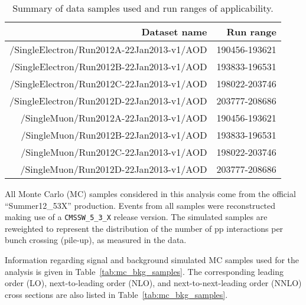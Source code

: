 \begin{table}[]
  \begin{center}
  \begin{tabular}{r|r}
  \hline
  Dataset name & Run range \\
  \hline
  /SingleElectron/Run2012A-22Jan2013-v1/AOD   &  190456-193621           \\
  \hline
  /SingleElectron/Run2012B-22Jan2013-v1/AOD   &   193833-196531       \\
  \hline
  /SingleElectron/Run2012C-22Jan2013-v1/AOD & 198022-203746\\
  \hline
  /SingleElectron/Run2012D-22Jan2013-v1/AOD  & 203777-208686 \\
  \hline
  /SingleMuon/Run2012A-22Jan2013-v1/AOD   &  190456-193621           \\
  \hline
  /SingleMuon/Run2012B-22Jan2013-v1/AOD   &   193833-196531       \\
  \hline
  /SingleMuon/Run2012C-22Jan2013-v1/AOD & 198022-203746\\
  \hline
  /SingleMuon/Run2012D-22Jan2013-v1/AOD  & 203777-208686 \\
  
  \hline
  \hline
  \end{tabular}
  \end{center}
  \caption{Summary of data samples used and run ranges of applicability.}
  \label{tab:datasets}
\end{table}%

All Monte Carlo (MC) samples considered in this analysis come from the official
``Summer12\_53X'' production.  Events from all samples were
reconstructed making use of a \texttt{CMSSW\_5\_3\_X} release version.
The simulated samples are reweighted to represent the distribution of the
number of pp interactions per bunch crossing (pile-up), as measured in
the data.



Information regarding signal and background simulated MC samples used for the analysis is given in 
Table~\ref{tab:mc_bkg_samples}.  
The corresponding leading order (LO), next-to-leading order (NLO),
 and next-to-next-leading order (NNLO) 
cross sections are also listed in Table~\ref{tab:mc_bkg_samples}.



